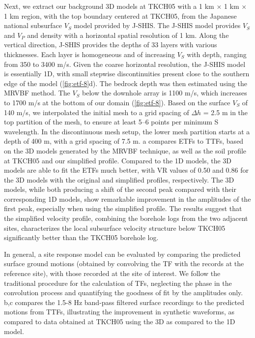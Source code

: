 Next, we extract our background 3D models at TKCH05 with a 1 km × 1 km × 1 km region, with the top boundary centered at TKCH05, from the Japanese national subsurface $V_S$ model provided by J-SHIS. The J-SHIS model provides $V_S$ and $V_P$ and density with a horizontal spatial resolution of 1 km. Along the vertical direction, J-SHIS provides the depths of 33 layers with various thicknesses. Each layer is homogeneous and of increasing $V_S$ with depth, ranging from 350 to 3400 m/s. Given the coarse horizontal resolution, the J-SHIS model is essentially 1D, with small stepwise discontinuities present close to the southern edge of the model (\cref{fig:etf-8}d). The bedrock depth was then estimated using the MRVBF method. The $V_S$ below the downhole array is 1100 m/s, which increases to 1700 m/s at the bottom of our domain (\cref{fig:etf-8}). Based on the surface $V_S$ of 140 m/s, we interpolated the initial mesh to a grid spacing of $\Delta{h}$ = 2.5 m in the top partition of the mesh, to ensure at least 5–6 points per minimum S wavelength. In the discontinuous mesh setup, the lower mesh partition starts at a depth of 400 m, with a grid spacing of 7.5 m. a compares ETFs to TTFs, based on the 3D models generated by the MRVBF technique, as well as the soil profile at TKCH05 and our simplified profile. Compared to the 1D models, the 3D models are able to fit the ETFs much better, with VR values of 0.50 and 0.86 for the 3D models with the original and simplified profiles, respectively. The 3D models, while both producing a shift of the second peak compared with their corresponding 1D models, show remarkable improvement in the amplitudes of the first peak, especially when using the simplified profile. The results suggest that the simplified velocity profile, combining the borehole logs from the two adjacent sites, characterizes the local subsurface velocity structure below TKCH05 significantly better than the TKCH05 borehole log.

In general, a site response model can be evaluated by comparing the predicted surface ground motions (obtained by convolving the TF with the records at the reference site), with those recorded at the site of interest. We follow the traditional procedure for the calculation of TFs, neglecting the phase in the convolution process and quantifying the goodness of fit by the amplitudes only. b,c compares the 1.5-8 Hz band-pass filtered surface recordings to the predicted motions from TTFs, illustrating the improvement in synthetic waveforms, as compared to data obtained at TKCH05 using the 3D as compared to the 1D model.

